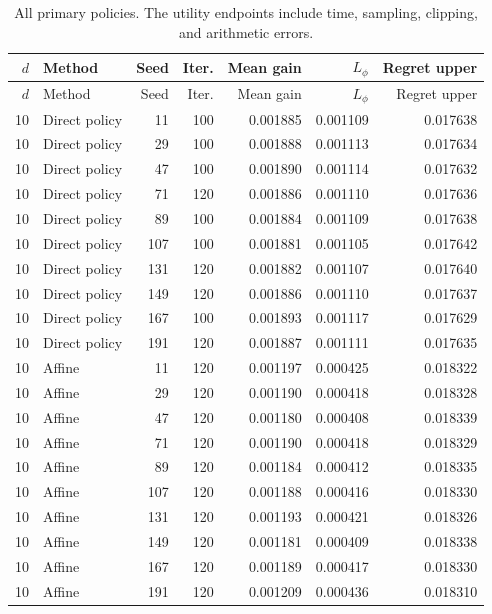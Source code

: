 {\small\setlength{\tabcolsep}{4pt}
\begin{longtable}{rlrrrrr}
\caption{All primary policies. The utility endpoints include time, sampling, clipping, and arithmetic errors.}\label{tab:r11allseeds}\\
\toprule
$d$ & Method & Seed & Iter. & Mean gain & $L_\phi$ & Regret upper\\\midrule\endfirsthead
$d$ & Method & Seed & Iter. & Mean gain & $L_\phi$ & Regret upper\\\midrule\endhead
10 & Direct policy & 11 & 100 & 0.001885 & 0.001109 & 0.017638 \\
10 & Direct policy & 29 & 100 & 0.001888 & 0.001113 & 0.017634 \\
10 & Direct policy & 47 & 100 & 0.001890 & 0.001114 & 0.017632 \\
10 & Direct policy & 71 & 120 & 0.001886 & 0.001110 & 0.017636 \\
10 & Direct policy & 89 & 100 & 0.001884 & 0.001109 & 0.017638 \\
10 & Direct policy & 107 & 100 & 0.001881 & 0.001105 & 0.017642 \\
10 & Direct policy & 131 & 120 & 0.001882 & 0.001107 & 0.017640 \\
10 & Direct policy & 149 & 120 & 0.001886 & 0.001110 & 0.017637 \\
10 & Direct policy & 167 & 100 & 0.001893 & 0.001117 & 0.017629 \\
10 & Direct policy & 191 & 120 & 0.001887 & 0.001111 & 0.017635 \\
10 & Affine & 11 & 120 & 0.001197 & 0.000425 & 0.018322 \\
10 & Affine & 29 & 120 & 0.001190 & 0.000418 & 0.018328 \\
10 & Affine & 47 & 120 & 0.001180 & 0.000408 & 0.018339 \\
10 & Affine & 71 & 120 & 0.001190 & 0.000418 & 0.018329 \\
10 & Affine & 89 & 120 & 0.001184 & 0.000412 & 0.018335 \\
10 & Affine & 107 & 120 & 0.001188 & 0.000416 & 0.018330 \\
10 & Affine & 131 & 120 & 0.001193 & 0.000421 & 0.018326 \\
10 & Affine & 149 & 120 & 0.001181 & 0.000409 & 0.018338 \\
10 & Affine & 167 & 120 & 0.001189 & 0.000417 & 0.018330 \\
10 & Affine & 191 & 120 & 0.001209 & 0.000436 & 0.018310 \\

\end{longtable}}
